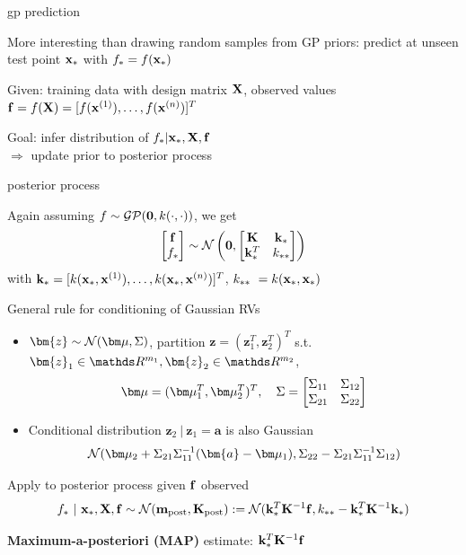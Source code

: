 \documentclass[11pt,compress,t,notes=noshow, xcolor=table]{beamer}
\begin{document}

\begin{framei}[sep=L]{gp prediction}
\item More interesting than drawing random samples from GP priors: predict at unseen test point $\xs$ with $f_\ast = f(\xs)$
\item Given: training data with design matrix $\Xmat$, observed values $\fv = f(\Xmat) = \fvec^T$
\item Goal: infer distribution of $f_\ast | \xs, \Xmat, \fv$ \\$\Rightarrow$ update prior to posterior process
\end{framei}

\begin{framei}[sep=M]{posterior process}
\item Again assuming $f \sim \GPzk$, we get
$$\begin{bmatrix}
\fv \\ f_\ast
\end{bmatrix} \sim  
\normal \left(\zero, \begin{bmatrix} \Kmat & \ks \\ \ks^T & \kss\end{bmatrix}\right)$$
with $\ks = [k(\xs, \xi[1]), \dots, k(\xs, \xi[n])]^T$,  $ \kss\ = k(\xs, \xs)$
\item General rule for conditioning of Gaussian RVs
\begin{itemize}
\item $\bm{z} \sim \normal(\muv, \Sigma)$, partition $\bm{z} = (\bm{z}_1^T, \bm{z}_2^T)^T$ s.t. $\bm{z}_1 \in \R^{m_1}, \bm{z}_2 \in \R^{m_2}$, $$\muv = (\muv_1^T, \muv_2^T)^T, \quad \Sigma = \begin{bmatrix} \Sigma_{11} & \Sigma_{12} \\ \Sigma_{21} & \Sigma_{22} \end{bmatrix} $$
\item Conditional distribution $\bm{z}_2 ~|~ \bm{z}_1 = \bm{a}$ is also Gaussian 
$$\normal(\muv_2 + \Sigma_{21} \Sigma_{11}^{-1} (\bm{a} - \muv_1), \Sigma_{22} - \Sigma_{21}\Sigma_{11}^{-1} \Sigma_{12})$$
\end{itemize}
\item Apply to posterior process given $\fv$ observed $$f_* ~|~ \xs, \Xmat, \fv \sim \normal(\mv_{\text{post}}, \Kmat_\text{post}) := \normal(\ks^{T}\Kinv\fv, \kss - \ks^T \Kmat ^{-1}\ks)$$
\item \textbf{Maximum-a-posteriori (MAP)} estimate: $\ks^{T}\Kinv\fv$
\end{framei}
\end{document}
